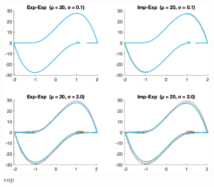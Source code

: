 \begin{figure}
    \centering
    \includegraphics[width=\textwidth]{plots/4a.eps}
    \caption{cap}
    \label{fig:4a}
\end{figure}

